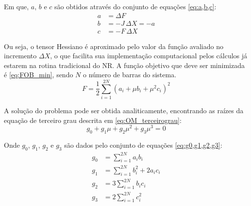 Em que, $a$, $b$ e $c$ são obtidos através do conjunto de equações \eqref{eq:a,b,c}:
\begin{equation}\label{eq:a,b,c}
    \begin{split}
        a &= \Delta F \\
        b &= -J \, \Delta X  = -a\\
        c &= -F \, \Delta X
    \end{split}
\end{equation}

Ou seja, o tensor Hessiano é aproximado pelo valor da função avaliado no incremento $\Delta X$, o que facilita sua implementação computacional pelos cálculos já estarem na rotina tradicional do \ac{NR}. A função objetivo que deve ser minimizada é \eqref{eq:FOB_min}, sendo $N$ o número de barras do sistema.
\begin{equation}\label{eq:FOB_min}
    F = \frac{1}{2} \sum_{i=1}^{2N}(a_i +\mu b_i + \mu^2 c_i)^2
\end{equation}

A solução do problema pode ser obtida analiticamente, encontrando as raízes da equação de terceiro grau descrita em \eqref{eq:OM_terceirograu}:
\begin{equation}\label{eq:OM_terceirograu}
    g_0 + g_1 \mu +g_2 \mu^2 + g_3 \mu^3 = 0
\end{equation}

Onde $g_0$, $g_1$, $g_2$ e $g_3$ são dados pelo conjunto de equações \eqref{eq:g0,g1,g2,g3}:
\begin{equation}\label{eq:g0,g1,g2,g3}
    \begin{split}
        g_0 &= \sum_{i=1}^{2N}a_ib_i \\
        g_1 &= \sum_{i=1}^{2N}b_i^2+2a_ic_i \\
        g_2 &= 3\sum_{i=1}^{2N}b_ic_i \\
        g_3 &= 2\sum_{i=1}^{2N}c_i^2
    \end{split}
\end{equation}

